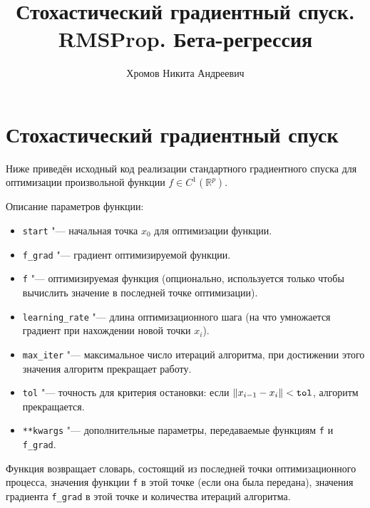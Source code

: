 \documentclass{article}
\begin{document}
\title{Стохастический градиентный спуск. RMSProp. Бета-регрессия}
\author{Хромов Никита Андреевич}
\date{\number\year}
\maketitle

\section{Стохастический градиентный спуск}
Ниже приведён исходный код реализации стандартного градиентного спуска для
оптимизации произвольной функции $f \in C^1(\mathbb{R}^p)$.

\label{lst:GD}
Описание параметров функции:
\begin{itemize}
  \item \verb|start| "--- начальная точка $x_0$ для оптимизации функции.
  \item \verb|f_grad| "--- градиент оптимизируемой функции.
  \item \verb|f| "--- оптимизируемая функция (опционально, используется только чтобы
    вычислить значение в последней точке оптимизации).
  \item \verb|learning_rate| "--- длина оптимизационного шага (на что умножается
    градиент при нахождении новой точки $x_i$).
  \item \verb|max_iter| "--- максимальное число итераций алгоритма,
    при достижении этого значения алгоритм прекращает работу.
  \item \verb|tol| "--- точность для критерия остановки: если
    $\|x_{i-1} - x_i\| < \verb|tol|$, алгоритм прекращается.
  \item \verb|**kwargs| "--- дополнительные параметры, передаваемые
    функциям \verb|f| и \verb|f_grad|.
\end{itemize}
Функция возвращает словарь, состоящий из последней точки оптимизационного процесса,
значения функции \verb|f| в этой точке (если она была передана), значения градиента
\verb|f_grad| в этой точке и количества итераций алгоритма.
\end{document}

